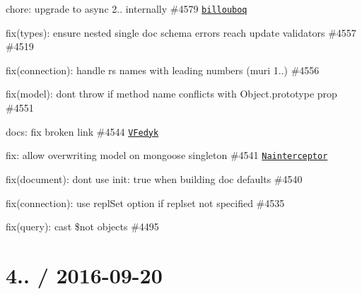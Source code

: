 \begin{DoxyItemize}
\item chore\+: upgrade to async 2.. internally \#4579 \href{https://github.com/billouboq}{\tt billouboq}
\item fix(types)\+: ensure nested single doc schema errors reach update validators \#4557 \#4519
\item fix(connection)\+: handle rs names with leading numbers (muri 1..) \#4556
\item fix(model)\+: don\textquotesingle{}t throw if method name conflicts with Object.\+prototype prop \#4551
\item docs\+: fix broken link \#4544 \href{https://github.com/VFedyk}{\tt V\+Fedyk}
\item fix\+: allow overwriting model on mongoose singleton \#4541 \href{https://github.com/Nainterceptor}{\tt Nainterceptor}
\item fix(document)\+: don\textquotesingle{}t use init\+: true when building doc defaults \#4540
\item fix(connection)\+: use repl\+Set option if replset not specified \#4535
\item fix(query)\+: cast \$not objects \#4495
\end{DoxyItemize}

\section*{4.. / 2016-\/09-\/20 }


